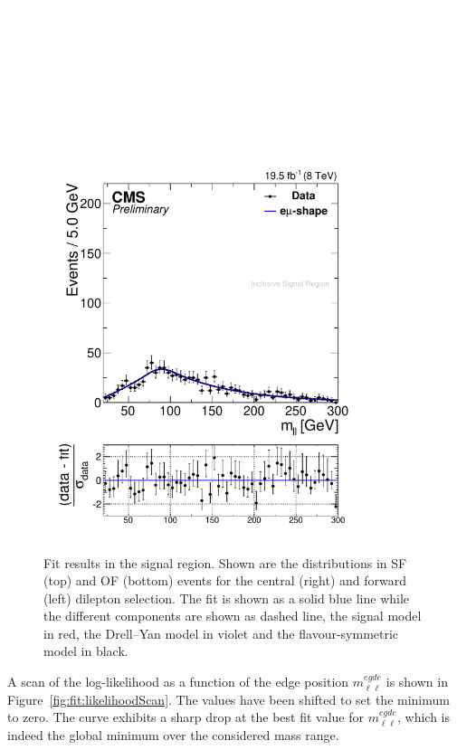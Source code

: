 \begin{figure}[hbp]
\begin{minipage}[t]{0.49\textwidth}
    \includegraphics[width=\textwidth]{plots/results/fit/fit2012OFOS_ETHTriangle_SignalInclusive_Combined_Full2012_ETHTriangle_Forward.pdf}
  \end{minipage}
  \caption{Fit results in the signal region. Shown are the \mll distributions in SF (top) and OF (bottom) events for the central (right) and forward (left) dilepton selection. The fit is shown as a solid blue line while the different components are shown as dashed line, the signal model in red, the Drell--Yan model in violet and the flavour-symmetric model in black.}
  \label{fig:fit:result}
\end{figure}



A scan of the log-likelihood as a function of the edge position $m_{\ell\ell}^{egde}$ is shown in Figure~\ref{fig:fit:likelihoodScan}. The values have been shifted to set the minimum to zero. The curve exhibits a sharp drop at the best fit value for $m_{\ell\ell}^{egde}$, which is indeed the global minimum over the considered mass range. 


